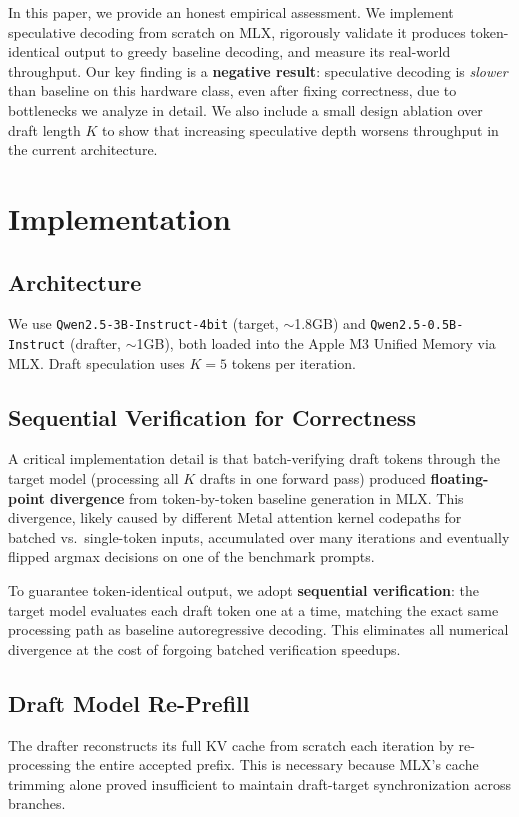 \documentclass[11pt]{article}
\begin{document}
In this paper, we provide an honest empirical assessment. We implement speculative decoding from scratch on MLX, rigorously validate it produces token-identical output to greedy baseline decoding, and measure its real-world throughput. Our key finding is a \textbf{negative result}: speculative decoding is \textit{slower} than baseline on this hardware class, even after fixing correctness, due to bottlenecks we analyze in detail. We also include a small design ablation over draft length $K$ to show that increasing speculative depth worsens throughput in the current architecture.

\section{Implementation}

\subsection{Architecture}
We use \texttt{Qwen2.5-3B-Instruct-4bit} (target, $\sim$1.8GB) and \texttt{Qwen2.5-0.5B-Instruct} (drafter, $\sim$1GB), both loaded into the Apple M3 Unified Memory via MLX. Draft speculation uses $K=5$ tokens per iteration.

\subsection{Sequential Verification for Correctness}
A critical implementation detail is that batch-verifying draft tokens through the target model (processing all $K$ drafts in one forward pass) produced \textbf{floating-point divergence} from token-by-token baseline generation in MLX. This divergence, likely caused by different Metal attention kernel codepaths for batched vs.\ single-token inputs, accumulated over many iterations and eventually flipped argmax decisions on one of the benchmark prompts.

To guarantee token-identical output, we adopt \textbf{sequential verification}: the target model evaluates each draft token one at a time, matching the exact same processing path as baseline autoregressive decoding. This eliminates all numerical divergence at the cost of forgoing batched verification speedups.

\subsection{Draft Model Re-Prefill}
The drafter reconstructs its full KV cache from scratch each iteration by re-processing the entire accepted prefix. This is necessary because MLX's cache trimming alone proved insufficient to maintain draft-target synchronization across branches.
\end{document}
